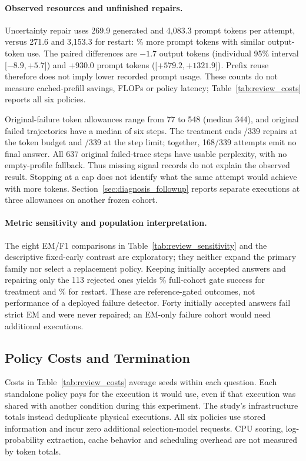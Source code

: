\documentclass{article}
\begin{document}
\paragraph{Observed resources and unfinished repairs.}
Uncertainty repair uses 269.9 generated and 4,083.3 prompt tokens per attempt,
versus 271.6 and 3,153.3 for restart: \ReviewPromptIncrease\% more prompt
tokens with similar output-token use. The paired differences are $-1.7$
output tokens (individual 95\% interval [$-8.9,+5.7$]) and $+930.0$ prompt
tokens ([$+579.2,+1321.9$]). Prefix reuse therefore does not imply lower
recorded prompt usage. These counts do not measure cached-prefill savings,
FLOPs or policy latency; Table~\ref{tab:review_costs} reports all six policies.

Original-failure token allowances range from 77 to 548 (median 344), and
original failed trajectories have a median of six steps. The treatment
ends \ReviewBudgetStops/339 repairs at the token budget and
\ReviewStepStops/339 at the step limit; together, 168/339 attempts emit no
final answer. All 637 original failed-trace steps have usable perplexity,
with no empty-profile fallback. Thus missing signal records do not explain
the observed result. Stopping at a cap does not identify what the same attempt
would achieve with more tokens. Section~\ref{sec:diagnosis_followup} reports
separate executions at three allowances on another frozen cohort.

\paragraph{Metric sensitivity and population interpretation.}
The eight EM/F1 comparisons in Table~\ref{tab:review_sensitivity} and the
descriptive fixed-early contrast are exploratory; they neither expand the
primary family nor select a replacement policy.
Keeping initially accepted answers and repairing only the 113 rejected ones
yields \ReviewWholeSuccess\% full-cohort gate success for treatment and
\ReviewWholeRestartSuccess\% for restart. These are reference-gated outcomes,
not performance of a deployed failure detector. Forty initially accepted
answers fail strict EM and were never repaired; an EM-only failure cohort
would need additional executions.

\subsection{Policy Costs and Termination}
Costs in Table~\ref{tab:review_costs} average seeds within each question.
Each standalone policy pays for the execution it would use, even if that
execution was shared with another condition during this experiment. The
study's infrastructure totals instead deduplicate physical executions.
All six policies use stored information and incur zero additional
selection-model requests. CPU scoring, log-probability extraction, cache
behavior and scheduling overhead are not measured by token totals.
\end{document}
